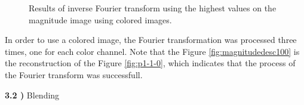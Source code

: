 \documentclass[12pt,a4paper]{article}
\begin{document}
\begin{figure}[!h]
{{		}
		\label{fig:magnitudedesc50}
	}
	\quad
	\quad
	
	\caption{Results of inverse Fourier transform using the highest values on the magnitude image using colored images.}
	\label{fig:magnitudeDESCColored}
\end{figure}

In order to use a colored image, the Fourier transformation was processed three times, one for each color channel. Note that the Figure \ref{fig:magnitudedesc100} is the reconstruction of the Figure \ref{fig:p1-1-0}, which indicates that the process of the Fourier transform was successfull.

\newpage

\textbf{3.2 )} Blending \\
\end{document}

